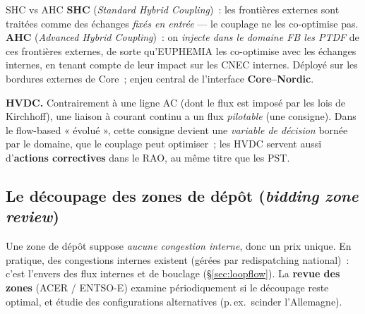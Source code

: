 \documentclass[11pt,a4paper]{article}
\begin{document}
\begin{defbox}{SHC vs AHC}
\textbf{SHC} (\emph{Standard Hybrid Coupling})~: les frontières externes sont
traitées comme des échanges \emph{fixés en entrée} — le couplage ne les
co-optimise pas.\\[3pt]
\textbf{AHC} (\emph{Advanced Hybrid Coupling})~: on \emph{injecte dans le
domaine FB les PTDF} de ces frontières externes, de sorte qu'EUPHEMIA les
co-optimise avec les échanges internes, en tenant compte de leur impact sur
les CNEC internes. Déployé sur les bordures externes de Core~; enjeu central
de l'interface \textbf{Core--Nordic}.
\end{defbox}

\noindent \textbf{HVDC.} Contrairement à une ligne AC (dont le flux est imposé
par les lois de Kirchhoff), une liaison à courant continu a un flux
\emph{pilotable} (une consigne). Dans le flow-based « évolué », cette consigne
devient une \emph{variable de décision} bornée par le domaine, que le couplage
peut optimiser~; les HVDC servent aussi d'\textbf{actions correctives} dans le
RAO, au même titre que les PST.

\subsection{Le découpage des zones de dépôt (\emph{bidding zone review})}
\label{sec:bzr}

Une zone de dépôt suppose \emph{aucune congestion interne}, donc un prix
unique. En pratique, des congestions internes existent (gérées par
redispatching national)~: c'est l'envers des flux internes et de bouclage
(\S\ref{sec:loopflow}). La \textbf{revue des zones} (ACER / ENTSO-E) examine
périodiquement si le découpage reste optimal, et étudie des configurations
alternatives (p.\,ex.\ scinder l'Allemagne).

\begin{center}
\end{center}
\end{document}
